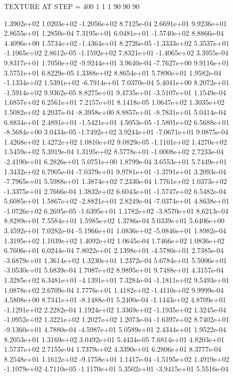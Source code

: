 TEXTURE AT STEP = 400
1 1 1
90 90 90

 1.3902e+02  1.0203e+02 -1.2056e+02  8.7125e-04
2.6691e+01 9.9236e+01 2.8655e+01  1.2850e-04
 7.3195e+01  6.0481e+01 -1.5740e+02  8.8866e-04
 4.4096e+00  1.5734e+02 -1.4364e+01  8.2726e-05
-1.3333e+02  5.3537e+01 -1.1065e+02  2.8612e-05
-1.1592e+02  7.8321e+01 -1.4065e+02  3.3955e-04
 9.8317e+01  1.7050e+02 -9.9244e+01  3.9640e-04
-7.7627e+00  9.9116e+01  3.5751e+01  6.8229e-05
1.3388e+02 8.8654e+01 5.7890e+01  1.9582e-04
-1.1334e+02  1.5391e+02 -6.7914e+01  7.0370e-04
 5.4041e+00  8.2072e+01 -1.5914e+02  9.9362e-05
 8.8275e+01  9.4735e+01 -3.5107e+01  1.1549e-04
1.6857e+02 6.2561e+01 7.2157e+01  8.1418e-05
1.0647e+02 1.3035e+02 1.5082e+02  4.2037e-04
-8.3958e+00  8.8857e+01 -8.7831e+01  5.0414e-04
 6.8834e+01  2.4891e+01 -1.5421e+01  4.5053e-05
-1.5801e+02  6.5688e+01 -8.5684e+00  3.0434e-05
-1.7492e+02  3.9244e+01 -7.0671e+01  9.0875e-04
1.4268e+02 1.4272e+02 1.0810e+02  9.0829e-05
-1.1101e+02  1.4270e+02  1.5459e+02  5.3919e-04
 1.3195e+02  8.5778e+01 -1.0008e+02  2.7233e-04
-2.4190e+01  6.2826e+01  5.0751e+00  1.8799e-04
3.6553e+01 5.7449e+01 1.3432e+02  6.7905e-04
-7.0379e+01  9.9781e+01 -1.3791e+01  3.2093e-04
-7.7965e+01  5.5988e+01  1.3874e+02  7.2330e-04
 1.7761e+02  1.0373e+02 -1.3375e+01  2.7666e-04
 1.3832e+02  6.6043e+01 -1.5747e+02  6.5482e-04
 5.6085e+01  1.5867e+02 -2.8821e+01  2.8249e-04
-7.0374e+01  4.8638e+01 -1.0726e+02  6.2695e-05
-1.6395e+01  1.1782e+02 -3.8570e+01  8.6213e-04
8.8289e+01 7.5584e+01 1.5985e+02  1.3786e-04
5.0339e+01 5.6406e+00 3.4592e+01  7.0282e-04
-5.1966e+01  1.0836e+02 -5.0846e+01  1.8982e-04
1.3195e+02 1.1039e+02 1.4092e+02  1.0645e-04
1.7466e+02 1.0836e+02 6.7606e+01  6.0244e-04
 7.8022e+01  2.1398e+01 -4.5780e+01  2.7385e-04
-3.6879e+01  1.3614e+02  1.3230e+01  1.2372e-04
 5.6784e+01  5.5006e+01 -3.0530e+01  5.6839e-04
1.7087e+02 8.9895e+01 9.7488e+01  4.3157e-04
 1.3285e+02  6.3481e+01 -4.1391e+01  7.3284e-04
-1.1811e+02  9.5493e+01  1.0878e+02  2.6709e-04
 1.7776e+01  1.4182e+02 -1.4110e+02  9.9999e-04
 4.5808e+00  8.7341e+01 -8.1488e-01  5.2400e-04
-1.1443e+02  4.8709e+01 -1.1291e+02  2.2282e-04
 1.1924e+02  1.3369e+02 -1.1935e+02  1.3245e-04
-1.0952e+02  1.3221e+02  1.2027e+02  1.2073e-04
-1.6397e+02  8.7402e+01 -9.1360e+01  4.7880e-04
-4.5987e+01  5.0589e+01  2.4344e+01  1.9522e-04
8.2053e+01 1.3169e+02 3.0492e+01  5.4434e-05
7.6814e+01 4.8203e+01 1.5737e+02  2.7155e-04
1.7379e+02 4.3390e+01 6.2806e+01  8.3777e-04
 8.2548e+01  1.1612e+02 -9.1758e+01  1.1417e-04
-1.5195e+02  1.4919e+02 -1.1079e+02  4.7110e-05
-1.1170e+01  5.3502e+01 -3.9415e+01  5.5516e-04
